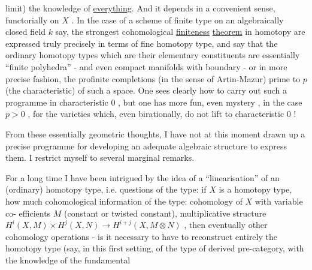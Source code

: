 
limit) the knowledge of \uline{everything}.  And it depends in a convenient
sense, functorially on $X$ .  In the case of a scheme of finite
type on an algebraically closed  field $k$  say, the strongest
cohomological \uline{finiteness} \uline{theorem} in homotopy are expressed truly
precisely in terms of fine homotopy type, and say that the
ordinary homotopy types which are their elementary constituents
are essentially ``finite polyhedra'' - and even compact manifolds
with boundary - or in more precise fashion, the profinite
completions (in the sense of Artin-Mazur) prime to $p$ (the
characteristic) of such a space.  One sees clearly how to carry
out such a programme in characteristic  $0$ , but one has  more
fun, even    mystery , in the case  $p > 0$ , for the varieties
which, even  birationally, do not lift to characteristic $0$ !

From these essentially geometric thoughts, I have not at
this moment drawn up a precise programme for developing an
adequate algebraic structure to express them.  I restrict myself
to several marginal remarks.

For a long time I  have been intrigued by the idea of a
``linearisation'' of an (ordinary) homotopy type, i.e. questions of
the type: if  $X$  is a homotopy type, how much cohomological
information of the type: cohomology of  $X$  with variable co-%
efficients  $M$ (constant or twisted constant), multiplicative
structure  $H^{i}(X, M) \times H^{j}(X, N) \to H^{i+j}(X, M \otimes N)$ ,  then eventually
other cohomology operations - is it necessary to have to reconstruct
entirely the homotopy type (say, in this first setting, of the
type of derived pre-category, with the knowledge of the fundamental

